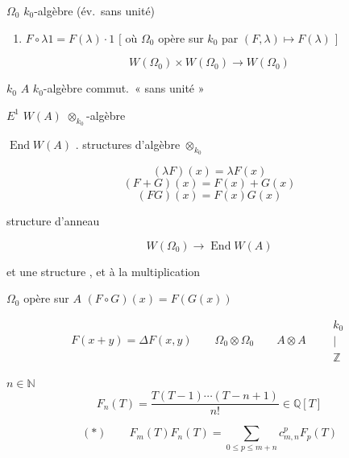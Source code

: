 \documentclass[11pt,a4paper]{article}
\begin{document}

$\Omega_0$ $k_0$-algèbre (év.\ sans unité)


\begin{enumerate}
\item[g)] $F \circ \lambda 1 = F(\lambda)\cdot 1$ \qquad
$\bigl[$ où $\Omega_0$ opère sur $k_0$ par $(F,\lambda) \mapsto F(\lambda)$
$\bigr]$
\end{enumerate}

\[
W(\Omega_0) \times W(\Omega_0) \longrightarrow W(\Omega_0)
\]


 \qquad $k_0$ \qquad $A$ $k_0$-algèbre commut.\ « sans unité »

$E^1$ \qquad {} \qquad {} \qquad
$W(A)$ \qquad $\otimes_{k_0}$-algèbre

$\operatorname{End} W(A)$ . \struck{\ill{}} structures d'algèbre
$\otimes_{k_0}$

\[
(\lambda F)(x) = \lambda F(x)
\]
\[
(F+G)(x) = F(x) + G(x)
\]
\[
(FG)(x) = F(x)G(x)
\]

structure \struck{\ill{}} d'anneau

\[
W(\Omega_0) \longrightarrow \operatorname{End} W(A)
\]

et une structure  \ill{}, et \ill{} à la multiplication

$\Omega_0$ opère sur $A$ \qquad $(F \circ G)(x) = F(G(x))$


\[
F(x+y) = \Delta F(x,y)
\qquad \Omega_0 \otimes \Omega_0
\qquad A \otimes A
\qquad
\begin{matrix} k_0 \\ | \\ \mathbb{Z} \end{matrix}
\]


$n \in \mathbb{N}$
\[
F_n(T) = \frac{T(T-1)\cdots(T-n+1)}{n!} \in \mathbb{Q}[T]
\]

\[
(*) \qquad F_m(T)F_n(T) = \sum_{0 \leq p \leq m+n} c^{p}_{m,n} F_p(T)
\]
\end{document}
